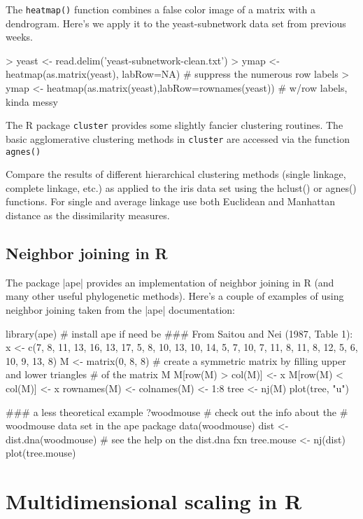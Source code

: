 The \texttt{heatmap()} function combines a false color image of a matrix with a dendrogram. Here's we apply it to the yeast-subnetwork data set from previous weeks.

\begin{Code}
> yeast <- read.delim('yeast-subnetwork-clean.txt')
> ymap <- heatmap(as.matrix(yeast), labRow=NA) # suppress the numerous row labels
> ymap <- heatmap(as.matrix(yeast),labRow=rownames(yeast)) # w/row labels, kinda messy

\end{Code}

The R package \texttt{cluster} provides some slightly fancier clustering routines. The basic agglomerative clustering methods in \texttt{cluster} are accessed via the function \texttt{agnes()} 

Compare the results of different hierarchical clustering methods (single linkage, complete linkage, etc.) as applied to the iris data set using the hclust() or agnes() functions. For single and average linkage use both Euclidean and Manhattan distance as the dissimilarity measures.

\subsection*{Neighbor joining in R}

The package |ape| provides an implementation of neighbor joining in R (and many other useful phylogenetic methods). Here's a couple of examples of using neighbor joining taken from the |ape| documentation:

\begin{Code}
library(ape) # install ape if need be
### From Saitou and Nei (1987, Table 1):
x <- c(7, 8, 11, 13, 16, 13, 17, 5, 8, 10, 13, 10, 14, 5, 7, 10, 7, 11, 8, 11, 8, 12, 5, 6, 10, 9, 13, 8)
M <- matrix(0, 8, 8)
# create a symmetric matrix by filling upper and lower triangles
# of the matrix M
M[row(M) > col(M)] <- x
M[row(M) < col(M)] <- x
rownames(M) <- colnames(M) <- 1:8
tree <- nj(M)
plot(tree, "u")

### a less theoretical example
?woodmouse  # check out the info about the 
            # woodmouse data set in the ape package
data(woodmouse)
dist <- dist.dna(woodmouse) # see the help on the dist.dna fxn
tree.mouse <- nj(dist)
plot(tree.mouse)
\end{Code}


\section*{Multidimensional scaling in R}

